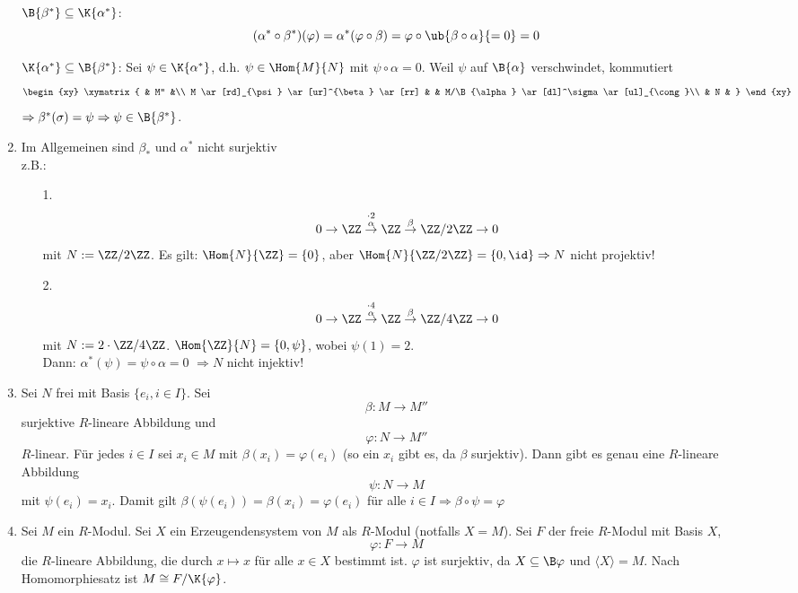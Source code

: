 \begin{Bew}
\begin{enumerate}
	  $\B{\beta^*} \subseteq \K{\alpha^*}$:
	  \[
	  (\alpha^* \circ 
	  \beta^*)(\varphi)= \alpha^*(\varphi\circ \beta)=\varphi \circ
	  \ub{\beta \circ \alpha}{=0}=0
	  \]

	  $\K{\alpha^*}\subseteq\B{\beta^*}$: Sei $\psi \in 
	  \K{\alpha^*}$, d.h. $\psi \in \Hom{M}{N}$ mit $\psi
	  \circ\alpha=0$.
	  Weil $\psi$ auf $\B{\alpha}$ verschwindet, kommutiert
	  \[
            \begin{xy}
              \xymatrix{
                                 & M'' &\\
                M \ar[rd]_{\psi} \ar[ur]^{\beta} \ar[rr] &     &  M/\B{\alpha}
                \ar[dl]^\sigma \ar[ul]_{\cong}\\
                &  N  & }
            \end{xy}
          \]
		  $\Rightarrow \beta^*(\sigma)= \psi \Rightarrow \psi\in\B{\beta^*}$.
	\item Im Allgemeinen sind $\beta_*$ und $\alpha^*$ nicht surjektiv\\
		z.B.: \begin{enumerate}
		\item[1.]
		\[
		0\rightarrow \ZZ \stackrel{\cdot2}{\stackrel{\alpha}\rightarrow} 
		\ZZ \stackrel\beta\rightarrow \ZZ / 2\ZZ\rightarrow 0
		\]
		mit $N:= \ZZ / 2\ZZ$.
		Es gilt: $\Hom{N}{\ZZ}=\{0\}$, aber
		$\Hom{N}{\ZZ/2\ZZ}=\{0, \id\}  \Rightarrow  N$ nicht projektiv!
		\item[2.]
		\[
		0\rightarrow \ZZ \stackrel{\cdot4}{\stackrel{\alpha}\rightarrow} \ZZ 
		\stackrel\beta\rightarrow \ZZ / 4\ZZ\rightarrow 0
		\]
		mit $N:= 2\cdot \ZZ / 4\ZZ$.
		$\Hom{\ZZ}{N}= \{0, \psi\}$, wobei $\psi(1)=2$.\\
		Dann: $\alpha^*(\psi)=\psi\circ \alpha = 0$ $\Rightarrow N$ nicht injektiv!
		\end{enumerate}
      \item Sei $N$ frei mit Basis $\{e_i,i \in I\}$.
            Sei 
            \[
            \beta: M \to M''
            \]
            surjektive $R$-lineare Abbildung und
            \[
            \varphi: N \to M''
            \]
            $R$-linear. Für jedes $i \in I$ sei $x_i \in M$
            mit $\beta(x_i) = \varphi(e_i)$ (so ein $x_i$ gibt es, da $\beta$
            surjektiv). Dann gibt es genau eine $R$-lineare Abbildung
            \[
            \psi: N \to M
            \]
            mit $\psi(e_i) = x_i$. Damit gilt $\beta(\psi(e_i)) =
            \beta(x_i) = \varphi(e_i)$ für alle $i \in I \Rightarrow \beta \circ
            \psi = \varphi$
      \item \label{1.5fBew}
            Sei $M$ ein $R$-Modul. Sei $X$ ein Erzeugendensystem von $M$ als
            $R$-Modul (notfalls $X = M$). Sei $F$ der freie $R$-Modul mit Basis
            $X$,
            \[
            \varphi: F \to M
            \]
            die $R$-lineare Abbildung, die durch $x
            \mapsto x$ für alle $x \in X$ bestimmt ist. $\varphi$ ist surjektiv,
            da $X \subseteq \B\varphi$ und $\langle X \rangle = M$.
            Nach Homomorphiesatz ist $M \cong F/\K{\varphi}$.
  \end{enumerate}
\end{Bew}

